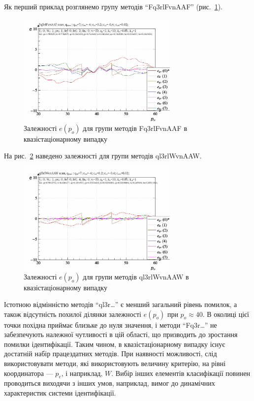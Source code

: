 \documentclass[a4paper,13pt]{atuaref}
\begin{document}
Як перший приклад розглянемо групу методів
``Fq3rlFvnAAF'' (рис.~\ref{atu:f:Fq3rlFvnAAF_scan}).

\begin{figure}[htb!]
  \centerline{
    \includegraphics[width=0.7\textwidth]{p3/p/scan/qls-p_p_e_Fq3rlFvnAAF_scan.png}
  }
  \caption{Залежності $ e (p_o) $ для групи методів Fq3rlFvnAAF в квазістаціонарному випадку}
  \label{atu:f:Fq3rlFvnAAF_scan}
\end{figure}

На рис.~\ref{atu:f:ql3rlWvnAAW_scan} наведено залежності для групи методів ql3rlWvnAAW.
%
\begin{figure}[htb!]
  \centerline{
    \includegraphics[width=0.7\textwidth]{p3/p/scan/qls-p_p_e_ql3rlWvnAAW_scan.png}
  }
  \caption{Залежності $ e (p_o) $ для групи методів ql3rlWvnAAW в квазістаціонарному випадку}
  \label{atu:f:ql3rlWvnAAW_scan}
\end{figure}

Істотною відмінністю методів ``ql3r\ldots'' є менший загальний рівень
помилок, а також відсутність похилої ділянки залежності $ e (p_o) $ при
$ p_o \approx 40 $. В околиці цієї точки похідна приймає близьке до нуля значення, і
методи ``Fq3r\ldots'' не забезпечують належної чутливості в цій області, що
призводить до зростання помилки ідентифікації.
Таким чином, в квазістаціонарному випадку існує достатній набір працездатних
методів. При наявності можливості, слід використовувати методи, які
використовують величину критерію, на рівні координатора --- $ p_e $, і
наприклад, $ W $. Вибір інших елементів класифікації повинен проводиться
виходячи з інших умов, наприклад, вимог до динамічних характеристик системи
ідентифікації.
\end{document}
